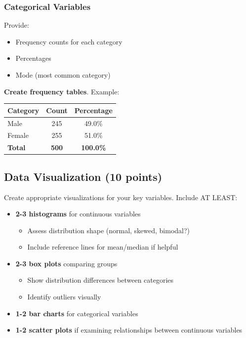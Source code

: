 \documentclass[11pt]{article}
\begin{document}
\subsubsection{Categorical Variables}
Provide:
\begin{itemize}
\item Frequency counts for each category
\item Percentages
\item Mode (most common category)
\end{itemize}

\textbf{Create frequency tables}. Example:

\begin{center}
\begin{tabular}{lcc}
\toprule
\textbf{Category} & \textbf{Count} & \textbf{Percentage} \\
\midrule
Male & 245 & 49.0\% \\
Female & 255 & 51.0\% \\
\textbf{Total} & \textbf{500} & \textbf{100.0\%} \\
\bottomrule
\end{tabular}
\end{center}

\subsection{Data Visualization (10 points)}

Create appropriate visualizations for your key variables. Include AT LEAST:

\begin{itemize}
\item \textbf{2-3 histograms} for continuous variables
  \begin{itemize}
  \item Assess distribution shape (normal, skewed, bimodal?)
  \item Include reference lines for mean/median if helpful
  \end{itemize}
\item \textbf{2-3 box plots} comparing groups
  \begin{itemize}
  \item Show distribution differences between categories
  \item Identify outliers visually
  \end{itemize}
\item \textbf{1-2 bar charts} for categorical variables
\item \textbf{1-2 scatter plots} if examining relationships between continuous variables
\end{itemize}
\end{document}
